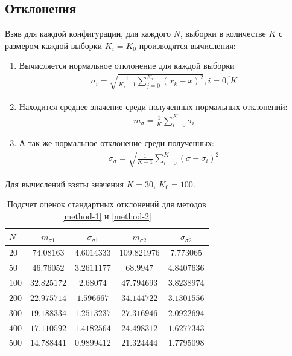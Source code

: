 \subsection{Отклонения}
Взяв для каждой конфигурации, для каждого \(N\), выборки в количестве \(K\) с размером каждой выборки \(K_i = K_0\) производятся вычисления:
\begin{enumerate}
	\item Вычисляется нормальное отклонение для каждой выборки
	      \begin{align}
		      \sigma_i = \sqrt{\frac{1}{K_i-1}\sum_{j=0}^{K_i} (x_k - \overline{x})^2}, i=\overline{0,K}
	      \end{align}
	\item Находится среднее значение среди полученных нормальных отклонений:
	      \begin{align}
		      m_\sigma = \frac{1}{K}\sum_{i=0}^K \sigma_i
	      \end{align}
	\item А так же нормальное отклонение среди полученных:
	      \begin{align}
		      \sigma_\sigma = \sqrt{\frac{1}{K-1}\sum_{i=0}^K(\sigma - \sigma_i)^2}
	      \end{align}
\end{enumerate}
Для вычислений взяты значения \(K=30\), \(K_0=100\).
\begin{table}[h!]
	\centering
	\caption{Подсчет оценок стандартных отклонений для методов \cref{method-1} и \cref{method-2}}
	\label{table:sigma-values}
	\begin{tabular}{|l|cccc|}
		\hline
		$N$     & $m_{\sigma1}$ & $\sigma_{\sigma1}$ & $m_{\sigma2}$  & $\sigma_{\sigma2}$ \\
		\hline
		$  20 $ & $  74.08163 $ & $ 4.6014333 $      & $ 109.821976 $ & $  7.773065 $      \\
		$  50 $ & $  46.76052 $ & $ 3.2611177 $      & $    68.9947 $ & $ 4.8407636 $      \\
		$ 100 $ & $ 32.825172 $ & $   2.68074 $      & $  47.794693 $ & $ 3.8238974 $      \\
		$ 200 $ & $ 22.975714 $ & $  1.596667 $      & $  34.144722 $ & $ 3.1301556 $      \\
		$ 300 $ & $ 19.188334 $ & $ 1.2513237 $      & $  27.316946 $ & $ 2.0922694 $      \\
		$ 400 $ & $ 17.110592 $ & $ 1.4182564 $      & $  24.498312 $ & $ 1.6277343 $      \\
		$ 500 $ & $ 14.788441 $ & $ 0.9899412 $      & $  21.324444 $ & $ 1.7795098 $      \\
		\hline
	\end{tabular}
\end{table}
